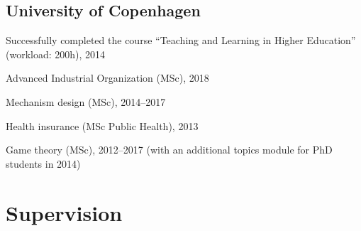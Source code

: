 \documentclass[a4paper]{article}
\renewenvironment{itemize}{
  \begin{list}{}{
    \setlength{\leftmargin}{1.5em}
  }
}{
  \end{list}
}
\begin{document}
\subsection*{University of Copenhagen}

Successfully completed the course ``Teaching and Learning in Higher Education'' (workload: 200h), 2014

\begin{itemize}
  \item Advanced Industrial Organization (MSc), 2018
\item Mechanism design (MSc), 2014--2017
\item Health insurance (MSc Public Health), 2013
\item Game theory (MSc), 2012--2017 (with an additional topics module for PhD students in 2014)
\end{itemize}





\section*{Supervision}
\end{document}
